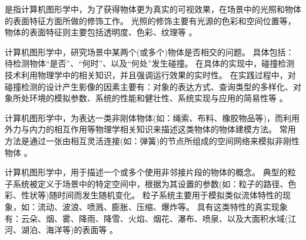 \begin{definition}[渲染]
是指计算机图形学中，为了获得物体更为真实的可视效果，在场景中的光照和物体的表面特征方面所做的修饰工作。
光照的修饰主要有光源的色彩和空间位置等，物体的表面特征则主要包括透明度、色彩、纹理等 \cite{Hearn2004CGBook}。
\end{definition}

\begin{definition}[碰撞检测]
计算机图形学中，研究场景中某两个(或多个)物体是否相交的问题。
具体包括：待检测物体“是否”、“何时”、以及“何处”发生碰撞。
在具体的实现中，碰撞检测技术利用物理学中的相关知识，并且强调运行效果的实时性。
在实践过程中，对碰撞检测的设计产生影像的因素主要有：对象的表达方式、查询类型的多样化、对象所处环境的模拟参数、系统的性能和健壮性、系统实现与应用的简易性等 \cite{Ericson2005CDBook}。%
\end{definition}

\begin{definition}[形变模型]
计算机图形学中，为表达一类非刚体物体(如：绳索、布料、橡胶物品等)，而利用外力与内力的相互作用等物理学相关知识来描述这类物体的物体建模方法。
常用方法是通过一张由相互灵活连接(如：弹簧)的节点所组成的空间网络来模拟非刚性物体 \cite{Hearn2004CGBook}。
\end{definition}

\begin{definition}[中心线提取]
\end{definition}

\begin{definition}[状态机]
\end{definition}

\begin{definition}[粒子系统]
计算机图形学中，用于描述一个或多个使用非邻接片段的物体的概念。
典型的粒子系统被定义于场景中的特定空间中，根据为其设置的参数(如：粒子的路径、色彩、性状等)随时间而发生随机变化。
粒子系统主要用于模拟类似流体特性的现象，如：流动、波浪、喷溅、膨胀、压缩、爆炸等。
具有这类特性的真实现象有：云朵、烟、雾、降雨、降雪、火焰、烟花、瀑布、喷泉、以及大面积水域(江河、湖泊、海洋等)的表面等 \cite{Hearn2004CGBook}。
\end{definition}
